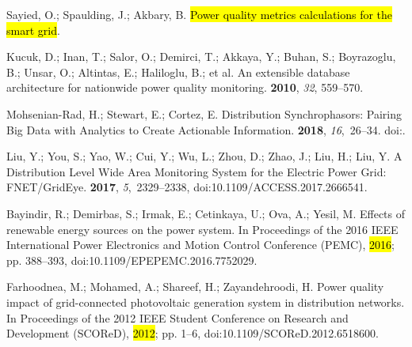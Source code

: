 \documentclass[energies,article,accept,moreauthors,pdftex]{Definitions/mdpi}
\begin{document}
\begin{thebibliography}{999}
Sayied, O.; Spaulding, J.; Akbary, B.
\newblock \hl{Power quality metrics calculations for the smart grid}. %

Kucuk, D.; Inan, T.; Salor, O.; Demirci, T.; Akkaya, Y.; Buhan, S.; Boyrazoglu,
B.; Unsar, O.; Altintas, E.; Haliloglu, B.; et al.
\newblock An extensible database architecture for nationwide power quality
monitoring.
 {\bf 2010}, {\em 32},  559--570.

Mohsenian-Rad, H.; Stewart, E.; Cortez, E.
\newblock Distribution {Synchrophasors}: {Pairing} {Big} {Data} with
{Analytics} to {Create} {Actionable} {Information}.
 {\bf 2018}, {\em 16},~26--34.
\newblock
doi:{\href{https://doi.org/10.1109/MPE.2018.2790818}{}}.

Liu, Y.; You, S.; Yao, W.; Cui, Y.; Wu, L.; Zhou, D.; Zhao, J.; Liu, H.; Liu,
Y.
\newblock A {Distribution} {Level} {Wide} {Area} {Monitoring} {System} for the
{Electric} {Power} {Grid}: {FNET}/{GridEye}.
 {\bf 2017}, {\em 5},~2329--2338, doi:10.1109/ACCESS.2017.2666541.

Bayindir, R.; Demirbas, S.; Irmak, E.; Cetinkaya, U.; Ova, A.; Yesil, M.
\newblock Effects of renewable energy sources on the power system.
\newblock In {Proceedings of the } 2016 {IEEE} {International} {Power} {Electronics} and {Motion}
{Control} {Conference} ({PEMC}), \hl{2016}; pp. 388--393, doi:10.1109/EPEPEMC.2016.7752029.

Farhoodnea, M.; Mohamed, A.; Shareef, H.; Zayandehroodi, H.
\newblock Power quality impact of grid-connected photovoltaic generation system
in distribution networks.
\newblock In {Proceedings of the } 2012 {IEEE} {Student} {Conference} on {Research} and {Development}
({SCOReD}), \hl{2012}; pp. 1--6, doi:10.1109/SCOReD.2012.6518600.


\end{thebibliography}
\end{document}
